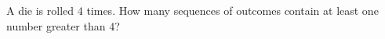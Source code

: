 A die is rolled $4$ times. How many sequences of outcomes contain at least one number greater than $4$?
